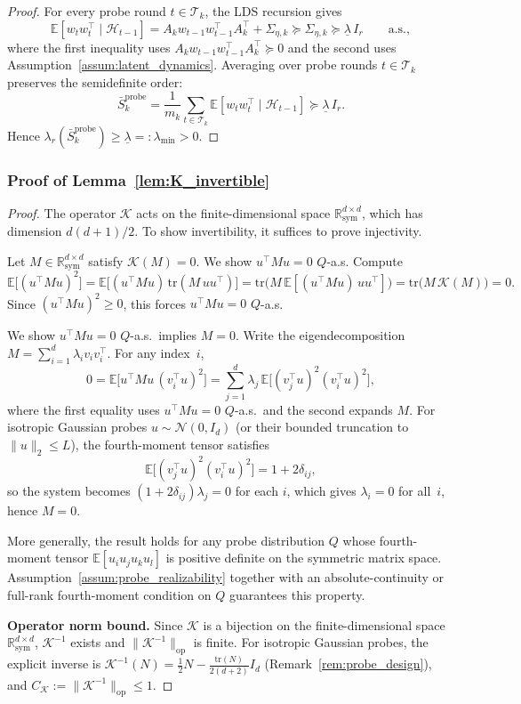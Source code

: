 \documentclass{article}
\newcommand{\R}{\mathbb{R}}
\newcommand{\E}{\mathbb{E}}
\newcommand{\op}{\mathrm{op}}
\newcommand{\cH}{\mathcal{H}}
\newcommand{\cT}{\mathcal{T}}
\newcommand{\tr}{\mathrm{tr}}
\begin{document}
\begin{proof}
For every probe round $t \in \cT_k$, the LDS recursion gives
\[
\E[w_t w_t^\top \mid \cH_{t-1}]
= A_k w_{t-1} w_{t-1}^\top A_k^\top + \Sigma_{\eta,k}
\succeq \Sigma_{\eta,k}
\succeq \underline{\lambda}\, I_r
\qquad \text{a.s.},
\]
where the first inequality uses $A_k w_{t-1} w_{t-1}^\top A_k^\top \succeq 0$ and the second uses Assumption~\ref{assum:latent_dynamics}.
Averaging over probe rounds $t \in \cT_k$ preserves the semidefinite order:
\[
\bar S_k^{\mathrm{probe}}
= \frac{1}{m_k}\sum_{t \in \cT_k} \E[w_t w_t^\top \mid \cH_{t-1}]
\succeq \underline{\lambda}\, I_r.
\]
Hence $\lambda_r(\bar S_k^{\mathrm{probe}}) \ge \underline{\lambda} =: \lambda_{\min} > 0$.
\end{proof}

\subsubsection{Proof of Lemma~\ref{lem:K_invertible}}
\label{proof:K_invertible}

\begin{proof}
The operator $\mathcal K$ acts on the finite-dimensional space $\R^{d\times d}_{\mathrm{sym}}$, which has dimension $d(d+1)/2$.  To show invertibility, it suffices to prove injectivity.

Let $M\in\R^{d\times d}_{\mathrm{sym}}$ satisfy $\mathcal K(M)=0$.  We show $u^\top M u = 0$ $Q$-a.s.  Compute
\[
\E\bigl[(u^\top M u)^2\bigr]
= \E\bigl[(u^\top M u)\,\tr(M\,uu^\top)\bigr]
= \tr\!\bigl(M\,\E[(u^\top M u)\,uu^\top]\bigr)
= \tr\bigl(M\,\mathcal K(M)\bigr)
= 0.
\]
Since $(u^\top M u)^2 \ge 0$, this forces $u^\top M u = 0$ $Q$-a.s.

We show $u^\top M u = 0$ $Q$-a.s.\ implies $M = 0$.  Write the eigendecomposition $M = \sum_{i=1}^d \lambda_i v_i v_i^\top$.  For any index~$i$,
\[
0 = \E\bigl[u^\top M u\,(v_i^\top u)^2\bigr]
= \sum_{j=1}^d \lambda_j\,\E\bigl[(v_j^\top u)^2(v_i^\top u)^2\bigr],
\]
where the first equality uses $u^\top M u = 0$ $Q$-a.s.\ and the second expands $M$.
For isotropic Gaussian probes $u \sim \mathcal N(0,I_d)$ (or their bounded truncation to $\|u\|_2 \le L$), the fourth-moment tensor satisfies
\[
\E\bigl[(v_j^\top u)^2(v_i^\top u)^2\bigr] = 1 + 2\delta_{ij},
\]
so the system becomes $(1+2\delta_{ij})\lambda_j = 0$ for each $i$, which gives $\lambda_i = 0$ for all~$i$, hence $M = 0$.

More generally, the result holds for any probe distribution $Q$ whose fourth-moment tensor $\E[u_i u_j u_k u_l]$ is positive definite on the symmetric matrix space.  Assumption~\ref{assum:probe_realizability} together with an absolute-continuity or full-rank fourth-moment condition on $Q$ guarantees this property.

\textbf{Operator norm bound.}
Since $\mathcal K$ is a bijection on the finite-dimensional space $\R^{d\times d}_{\mathrm{sym}}$, $\mathcal K^{-1}$ exists and $\|\mathcal K^{-1}\|_{\op}$ is finite.  For isotropic Gaussian probes, the explicit inverse is $\mathcal K^{-1}(N) = \frac{1}{2}N - \frac{\tr(N)}{2(d+2)}I_d$ (Remark~\ref{rem:probe_design}), and $C_{\mathcal K} := \|\mathcal K^{-1}\|_{\op} \le 1$.
\end{proof}
\end{document}
